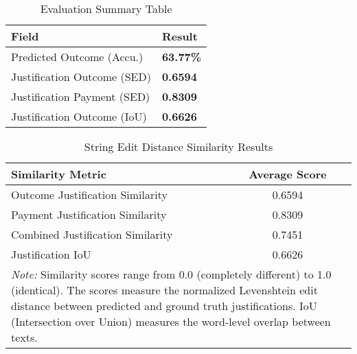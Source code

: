 
\begin{table}[H]
\centering
\caption{Evaluation Summary Table}
\label{tab:evaluation_summary}
\begin{tabular}{@{}lp{2cm}@{}}
\toprule
\textbf{Field} & \textbf{Result} \\
\midrule
Predicted Outcome (Accu.) & \textbf{63.77\%} \\
Justification Outcome (SED) &  \textbf{0.6594} \\
Justification Payment (SED) &  \textbf{0.8309} \\
Justification Outcome (IoU) &  \textbf{0.6626} \\
\bottomrule
\end{tabular}
\end{table}

\begin{table}[H]
\centering
\caption{String Edit Distance Similarity Results}
\label{tab:string_edit_distance_results}
\begin{tabular}{lc}
\toprule
\textbf{Similarity Metric} & \textbf{Average Score} \\
\midrule
Outcome Justification Similarity & 0.6594 \\
Payment Justification Similarity & 0.8309 \\
Combined Justification Similarity & 0.7451 \\
Justification IoU & 0.6626 \\
\midrule
\multicolumn{2}{p{13cm}}{\textit{Note:} Similarity scores range from 0.0 (completely different) to 1.0 (identical). 
The scores measure the normalized Levenshtein edit distance between predicted and ground truth justifications.
IoU (Intersection over Union) measures the word-level overlap between texts.} \\
\bottomrule
\end{tabular}
\end{table}

